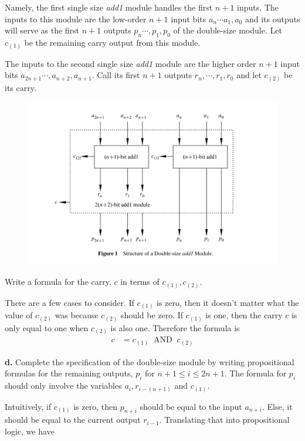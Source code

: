 \documentclass[12pt]{article}
\begin{document}
\newline
\par{Namely, the first single size \textit{add1} module handles the first $n + 1$ inputs. The inputs to this module are the low-order $n + 1$ input bits $a_n\cdots a_1,a_0$ and its outputs will serve as the first $n + 1$ outputs $p_n\cdots,p_1,p_0$ of the double-size module. Let $c_{(1)}$ be the remaining carry output from this module.}
\newline
\par{The inputs to the second single size \textit{add1}} module are the higher order $n + 1$ input bits $a_{2n + 1}\cdots,a_{n + 2},a_{n + 1}$. Call its first $n + 1$ outputs $r_n,\cdots,r_1,r_0$ and let $c_{(2)}$ be its carry.
\begin{figure}[h]
	\centering
	\includegraphics[width=0.7\linewidth]{1_double_sized_adder.png}
\end{figure}
\par{Write a formula for the carry, $c$ in terms of $c_{(1)}, c_{(2)}$.}
\newline
\par{There are a few cases to consider. If $c_{(1)}$ is zero, then it doesn't matter what the value of $c_{(2)}$ was because $c_{(2)}$ should be zero. If $c_{(1)}$ is one, then the carry $c$ is only equal to one when $c_{(2)}$ is also one. Therefore the formula is}
\begin{align*}
c &= c_{(1)}\;\;\text{AND}\;\;c_{(2)}
\end{align*}
\par{\textbf{d.} Complete the specification of the double-size module by writing propositional formulas for the remaining outputs, $p_i$ for $n + 1 \leq i \leq 2n + 1$. The formula for $p_i$ should only involve the variables $a_i, r_{i - (n + 1)}$ and $c_{(1)}$.}
\newline
\par{Intuitively, if $c_{(1)}$ is zero, then $p_{n + i}$ should be equal to the input $a_{n + i}$. Else, it should be equal to the current output $r_{i - 1}$. Translating that into propositional logic, we have}
\end{document}
